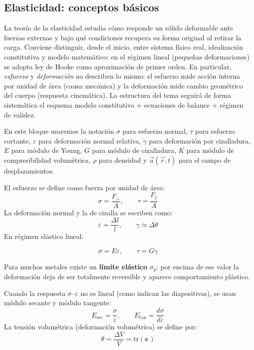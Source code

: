 \documentclass[12pt, a4paper]{article}
\theoremstyle{plain}
\theoremstyle{definition}
\theoremstyle{remark}
\newcommand{\ve}[1]{\vec{#1}}
\begin{document}
\subsection{Elasticidad: conceptos básicos}

La teoría de la elasticidad estudia cómo responde un sólido deformable ante fuerzas externas
y bajo qué condiciones recupera su forma original al retirar la carga. Conviene distinguir,
desde el inicio, entre sistema físico real, idealización constitutiva y modelo matemático:
en el régimen lineal (pequeñas deformaciones) se adopta ley de Hooke como aproximación
de primer orden.
En particular, \emph{esfuerzo} y \emph{deformación} no describen lo mismo: el esfuerzo mide
acción interna por unidad de área (causa mecánica) y la deformación mide cambio geométrico
del cuerpo (respuesta cinemática).
La estructura del tema seguirá de forma sistemática el esquema
modelo constitutivo + ecuaciones de balance + régimen de validez.

En este bloque usaremos la notación $\sigma$ para esfuerzo normal, $\tau$ para esfuerzo
cortante, $\varepsilon$ para deformación normal relativa, $\gamma$ para deformación por
cizalladura, $E$ para módulo de Young, $G$ para módulo de cizalladura, $K$ para módulo de
compresibilidad volumétrica, $\rho$ para densidad y $\ve{u}(\ve{r},t)$ para el campo de
desplazamientos.

El esfuerzo se define como fuerza por unidad de área:
\begin{equation}
  \sigma = \frac{F_\perp}{A},\qquad \tau = \frac{F_\parallel}{A}
\end{equation}
La deformación normal y la de cizalla se escriben como:
\begin{equation}
  \varepsilon = \frac{\Delta l}{l},\qquad \gamma \simeq \Delta\theta
\end{equation}
En régimen elástico lineal:
\begin{mdframed}[style=resultado]
\begin{equation}
  \sigma = E\varepsilon,\qquad \tau = G\gamma
\end{equation}
\end{mdframed}

Para muchos metales existe un \textbf{límite elástico} $\sigma_y$: por encima de ese valor
la deformación deja de ser totalmente reversible y aparece comportamiento plástico.

Cuando la respuesta $\sigma$--$\varepsilon$ no es lineal (como indican las diapositivas), se
usan módulo secante y módulo tangente:
\begin{equation}
  E_{\mathrm{sec}}=\frac{\sigma}{\varepsilon},\qquad
  E_{\mathrm{tan}}=\frac{d\sigma}{d\varepsilon}
\end{equation}
La tensión volumétrica (deformación volumétrica) se define por:
\begin{equation}
  \theta=\frac{\Delta V}{V}=\mathrm{tr}(\boldsymbol{\varepsilon})
\end{equation}
\end{document}

